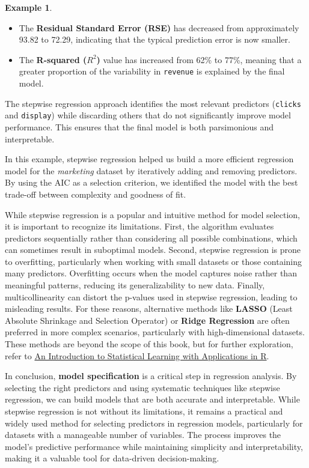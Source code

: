 \documentclass[
]{book}
\newcommand{\passthrough}[1]{#1}
\providecommand{\tightlist}{%
  \setlength{\itemsep}{0pt}\setlength{\parskip}{0pt}}
\theoremstyle{definition}
\theoremstyle{definition}
\newtheorem{example}{Example}[chapter]
\theoremstyle{definition}
\theoremstyle{definition}
\theoremstyle{remark}
\begin{document}
\begin{example}
\begin{itemize}
\tightlist
\item
  The \textbf{Residual Standard Error (RSE)} has decreased from approximately 93.82 to 72.29, indicating that the typical prediction error is now smaller.\\
\item
  The \textbf{R-squared (\(R^2\))} value has increased from 62\% to 77\%, meaning that a greater proportion of the variability in \passthrough{\lstinline!revenue!} is explained by the final model.
\end{itemize}

The stepwise regression approach identifies the most relevant predictors (\passthrough{\lstinline!clicks!} and \passthrough{\lstinline!display!}) while discarding others that do not significantly improve model performance. This ensures that the final model is both parsimonious and interpretable.
\end{example}

In this example, stepwise regression helped us build a more efficient regression model for the \emph{marketing} dataset by iteratively adding and removing predictors. By using the AIC as a selection criterion, we identified the model with the best trade-off between complexity and goodness of fit.

While stepwise regression is a popular and intuitive method for model selection, it is important to recognize its limitations. First, the algorithm evaluates predictors sequentially rather than considering all possible combinations, which can sometimes result in suboptimal models. Second, stepwise regression is prone to overfitting, particularly when working with small datasets or those containing many predictors. Overfitting occurs when the model captures noise rather than meaningful patterns, reducing its generalizability to new data. Finally, multicollinearity can distort the p-values used in stepwise regression, leading to misleading results. For these reasons, alternative methods like \textbf{LASSO} (Least Absolute Shrinkage and Selection Operator) or \textbf{Ridge Regression} are often preferred in more complex scenarios, particularly with high-dimensional datasets. These methods are beyond the scope of this book, but for further exploration, refer to \href{https://www.statlearning.com}{An Introduction to Statistical Learning with Applications in R}.

In conclusion, \textbf{model specification} is a critical step in regression analysis. By selecting the right predictors and using systematic techniques like stepwise regression, we can build models that are both accurate and interpretable. While stepwise regression is not without its limitations, it remains a practical and widely used method for selecting predictors in regression models, particularly for datasets with a manageable number of variables. The process improves the model's predictive performance while maintaining simplicity and interpretability, making it a valuable tool for data-driven decision-making.
\end{document}
